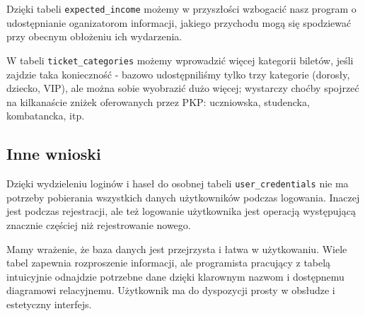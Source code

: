 \documentclass[12pt]{article}
\begin{document}
        Dzięki tabeli {\tt expected\_income} możemy w przyszłości wzbogacić nasz program o udostępnianie oganizatorom informacji, jakiego przychodu mogą się spodziewać przy obecnym obłożeniu ich wydarzenia.
        \\ \par
        W tabeli {\tt ticket\_categories} możemy wprowadzić więcej kategorii biletów, jeśli zajdzie taka konieczność - bazowo udostępniliśmy tylko trzy kategorie (dorosły, dziecko, VIP), ale można sobie wyobrazić dużo więcej; wystarczy choćby spojrzeć na kilkanaście zniżek oferowanych przez PKP: uczniowska, studencka, kombatancka, itp.  
        
    \subsection{Inne wnioski}
    
        Dzięki wydzieleniu loginów i haseł do osobnej tabeli {\tt user\_credentials} nie ma potrzeby pobierania wszystkich danych użytkowników podczas logowania. Inaczej jest podczas rejestracji, ale też logowanie użytkownika jest operacją występującą znacznie częściej niż rejestrowanie nowego.
        \\ \par
        Mamy wrażenie, że baza danych jest przejrzysta i łatwa w użytkowaniu. Wiele tabel zapewnia rozproszenie informacji, ale programista pracujący z tabelą intuicyjnie odnajdzie potrzebne dane dzięki klarownym nazwom i dostępnemu diagramowi relacyjnemu. Użytkownik ma do dyspozycji prosty w obsłudze i estetyczny interfejs.
        
\end{document}
